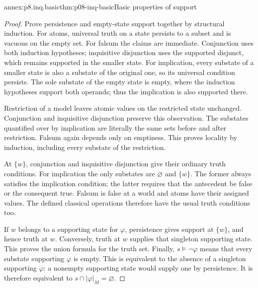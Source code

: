 \begin{annexitem}{annex:p8.inq.basic}{thm:p08-inq-basic}{Basic properties of support}
\begin{proof}
Prove persistence and empty-state support together by structural induction.
For atoms, universal truth on a state persists to a subset and is vacuous
on the empty set. For falsum the claims are immediate. Conjunction uses
both induction hypotheses; inquisitive disjunction uses the supported
disjunct, which remains supported in the smaller state. For implication,
every substate of a smaller state is also a substate of the original one,
so its universal condition persists. The sole substate of the empty state
is empty, where the induction hypotheses support both operands; thus the
implication is also supported there.

Restriction of a model leaves atomic values on the restricted state unchanged.
Conjunction and inquisitive disjunction preserve this observation. The
substates quantified over by implication are literally the same sets before
and after restriction. Falsum again depends only on emptiness. This proves
locality by induction, including every substate of the restriction.

At \(\{w\}\), conjunction and inquisitive disjunction give their ordinary
truth conditions. For implication the only substates are \(\varnothing\)
and \(\{w\}\). The former always satisfies the implication condition;
the latter requires that the antecedent be false or the consequent true.
Falsum is false at a world and atoms have their assigned values. The
defined classical operations therefore have the usual truth conditions too.

If \(w\) belongs to a supporting state for \(\varphi\), persistence gives
support at \(\{w\}\), and hence truth at \(w\). Conversely, truth at
\(w\) supplies that singleton supporting state. This proves the union
formula for the truth set. Finally, \(s\models\neg\varphi\) means that
every substate supporting \(\varphi\) is empty. This is equivalent to
the absence of a singleton supporting \(\varphi\): a nonempty supporting
state would supply one by persistence. It is therefore equivalent to
\(s\cap|\varphi|_M=\varnothing\).
\end{proof}
\end{annexitem}

